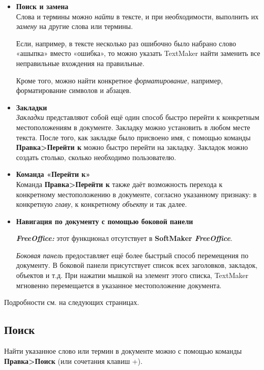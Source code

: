 ﻿\documentclass[a4paper,10pt]{article}
\begin{document}
\begin{itemize}
 \item \textbf{Поиск и замена}\\
 Слова и термины можно \textit{найти} в тексте, и при необходимости, выполнить их \textit{замену} на другие слова или термины.
 
 Если, например, в тексте несколько раз ошибочно было набрано слово «ашыпка» вместо «ошибка», то можно указать TextMaker найти заменить все неправильные вхождения на правильные.
 
 Кроме того, можно найти конкретное \textit{форматирование}, например, форматирование символов и абзацев.
 \item \textbf{Закладки}\\
 \textit{Закладки} представляют собой ещё один способ быстро перейти к конкретным местоположениям в документе. Закладку можно установить в любом месте текста. После того, как закладке было присвоено имя, с помощью команды \textbf{Правка>Перейти к} можно быстро перейти на закладку. Закладок можно создать столько, сколько необходимо пользователю.
 \item \textbf{Команда «Перейти к»}\\
 Команда \textbf{Правка>Перейти к} также даёт возможность перехода к конкретному местоположению в документе, согласно указанному признаку: в конкретную \textit{главу}, к конкретному \textit{объекту} и так далее.
 \item \textbf{Навигация по документу с помощью боковой панели}\\
 \begin{mdframed}[backgroundcolor=pink!50]
\textbf{\textit{FreeOffice:}} этот функционал отсутствует в \textbf{SoftMaker \textit{FreeOffice}}.
\end{mdframed}
\textit{Боковая панель} предоставляет ещё более быстрый способ перемещения по документу.  В боковой панели присутствует список всех заголовков, закладок, объектов и т.д. При нажатии мышкой на элемент этого списка, TextMaker мгновенно перемещается в указанное местоположение документа.
\end{itemize}

Подробности см. на следующих страницах.

\subsection{Поиск}
Найти указанное слово или термин в документе можно с помощью команды \textbf{Правка>Поиск} (или сочетания клавиш +).
\end{document}
